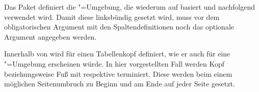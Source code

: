 \documentclass[%
  english,ngerman,%
  geometry=no,DIV=12,automark,%
]{tudscrartcl}
\begin{document}
Das Paket  definiert die "=Umgebung, die 
wiederum auf  basiert und nachfolgend verwendet wird. 
Damit diese linksbündig gesetzt wird, muss vor dem obligatorischen Argument mit 
den Spaltendefinitionen noch das optionale Argument  angegeben 
werden.
%
\CodeHook{\let\newglossarystyle\renewglossarystyle}
\begin{Preamble*}

\end{Preamble*}
%
Innerhalb von  wird  für einen
Tabellenkopf definiert, wie er auch für eine "=Umgebung 
erscheinen würde. In hier vorgestellten Fall werden Kopf beziehungsweise Fuß 
mit  respektive  terminiert. Diese werden beim 
einem möglichen Seitenumbruch zu Beginn und am Ende auf jeder Seite gesetzt.
\end{document}
